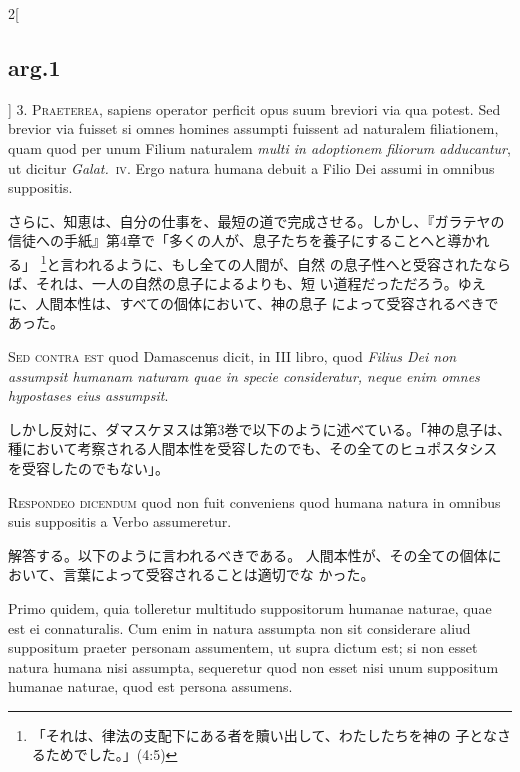 \documentclass[paper=a4paper,fontsize=10pt,jafontsize=9pt,titlepage]{jlreq}
\begin{document}
\begin{paracol}{2}[\subsection{arg.1}]
3. {\scshape Praeterea}, sapiens operator perficit opus suum breviori via qua
potest. Sed brevior via fuisset si omnes homines assumpti fuissent ad
naturalem filiationem, quam quod per unum Filium naturalem {\itshape multi in
adoptionem filiorum adducantur}, ut dicitur {\itshape Galat.}~{\scshape iv}. Ergo natura humana
debuit a Filio Dei assumi in omnibus suppositis.

\switchcolumn

さらに、知恵は、自分の仕事を、最短の道で完成させる。しかし、『ガラテヤの
 信徒への手紙』第4章で「多くの人が、息子たちを養子にすることへと導かれる」
 \footnote{「それは、律法の支配下にある者を贖い出して、わたしたちを神の
 子となさるためでした。」(4:5)}と言われるように、もし全ての人間が、自然
 の息子性へと受容されたならば、それは、一人の自然の息子によるよりも、短
 い道程だっただろう。ゆえに、人間本性は、すべての個体において、神の息子
 によって受容されるべきであった。

\switchcolumn*[\subsection{s.c.}]

{\scshape Sed contra est} quod Damascenus dicit, in III libro, quod {\itshape Filius Dei non
assumpsit humanam naturam quae in specie consideratur, neque enim omnes
hypostases eius assumpsit}.

\switchcolumn

しかし反対に、ダマスケヌスは第3巻で以下のように述べている。「神の息子は、
 種において考察される人間本性を受容したのでも、その全てのヒュポスタシス
 を受容したのでもない」。


{\scshape Respondeo dicendum} quod non fuit conveniens quod humana natura in
omnibus suis suppositis a Verbo assumeretur.

\switchcolumn

解答する。以下のように言われるべきである。
人間本性が、その全ての個体において、言葉によって受容されることは適切でな
 かった。

\switchcolumn*

Primo quidem, quia
tolleretur multitudo suppositorum humanae naturae, quae est ei
connaturalis. 
Cum enim in natura assumpta non sit considerare aliud
suppositum praeter personam assumentem, ut supra dictum est; si non
esset natura humana nisi assumpta, sequeretur quod non esset nisi unum
suppositum humanae naturae, quod est persona assumens.


\end{paracol}
\end{document}
